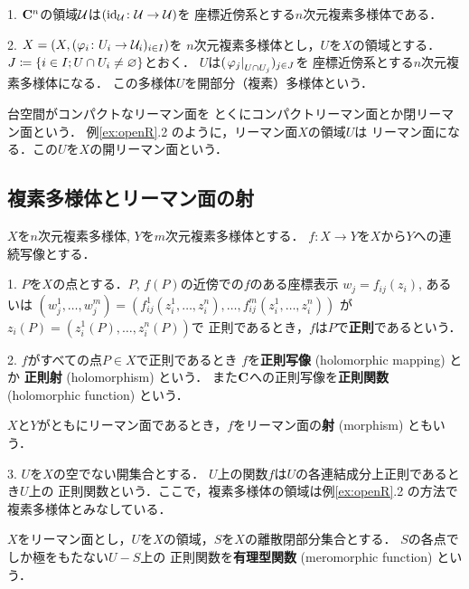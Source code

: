 \begin{Example}\label{ex:openR}
    1. 
    $\mathbf{C}^n$の領域$\mathcal{U}$は$(\mathrm{id}_{\mathcal{U}}\colon\mathcal{U}\to\mathcal{U})$を
    座標近傍系とする$n$次元複素多様体である．

    2. 
    $X=(X, (\varphi_{i}\colon U_{i}\to \mathcal{U}_{i})_{i\in I})$を
    $n$次元複素多様体とし，$U$を$X$の領域とする．
    $J\coloneqq\{i\in I; U\cap U_i \neq \varnothing\}$とおく．
    $U$は$(\left. \varphi_{j} \right|_{U\cap U_{j}})_{j\in J}$を
    座標近傍系とする$n$次元複素多様体になる．
    この多様体$U$を開部分（複素）多様体という．
\end{Example}

台空間がコンパクトなリーマン面を
とくにコンパクトリーマン面とか閉リーマン面という．
例\ref{ex:openR}.2 のように，リーマン面$X$の領域$U$は
リーマン面になる．この$U$を$X$の開リーマン面という．

\subsection{複素多様体とリーマン面の射}
\begin{Definition}
    $X$を$n$次元複素多様体, $Y$を$m$次元複素多様体とする．
    $f\colon X\to Y$を$X$から$Y$への連続写像とする．
    
    1. 
    $P$を$X$の点とする．$P$, $f(P)$の近傍での$f$のある座標表示
    $w_j=f_{ij}(z_i)$, あるいは
    $(w_{j}^{1},\dots,w_{j}^{m})
    =\left(f_{ij}^{1}(z_{i}^{1},\dots,z_{i}^{n}),\dots,f_{ij}^{m}(z_{i}^{1},\dots,z_{i}^{n})\right)$
    が$z_i(P)=(z_{i}^{1}(P),\dots,z_{i}^{n}(P))$で
    正則であるとき，$f$は$P$で\textbf{正則}であるという．
    
    2. 
    $f$がすべての点$P\in X$で正則であるとき
    $f$を\textbf{正則写像} (holomorphic mapping) とか
    \textbf{正則射} (holomorphism) という．
    また$\mathbf{C}$への正則写像を\textbf{正則関数} (holomorphic 
    function) という．

    $X$と$Y$がともにリーマン面であるとき，$f$をリーマン面の\textbf{射} (morphism) ともいう．

    3. 
    $U$を$X$の空でない開集合とする．
    $U$上の関数$f$は$U$の各連結成分上正則であるとき$U$上の
    正則関数という．ここで，複素多様体の領域は例\ref{ex:openR}.2 の方法で
    複素多様体とみなしている．
\end{Definition}
\begin{Definition}
    $X$をリーマン面とし，$U$を$X$の領域，$S$を$X$の離散閉部分集合とする．
    $S$の各点でしか極をもたない$U-S$上の
    正則関数を\textbf{有理型関数} (meromorphic function) という．
\end{Definition}

